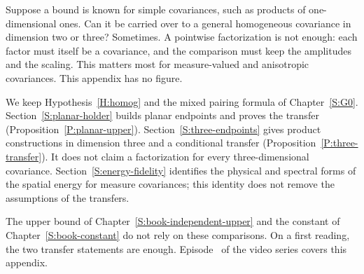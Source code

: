 Suppose a bound is known for simple covariances, such as products of
one-dimensional ones. Can it be carried over to a general homogeneous
covariance in dimension two or three? Sometimes. A pointwise factorization is
not enough: each factor must itself be a covariance, and the comparison must
keep the amplitudes and the scaling. This matters most for measure-valued
and anisotropic covariances. This appendix has no figure.

We keep Hypothesis~\ref{H:homog} and the mixed pairing formula
of Chapter~\ref{S:G0}. Section~\ref{S:planar-holder}
builds planar endpoints and proves the transfer
(Proposition~\ref{P:planar-upper}). Section~\ref{S:three-endpoints}
gives product constructions in dimension three and a conditional transfer
(Proposition~\ref{P:three-transfer}). It does not claim a factorization
for every three-dimensional covariance. Section~\ref{S:energy-fidelity}
identifies the physical and spectral forms of the spatial energy for measure
covariances; this identity does not remove the assumptions of the transfers.

The upper bound of Chapter~\ref{S:book-independent-upper} and the
constant of Chapter~\ref{S:book-constant} do not rely on these
comparisons. On a first reading, the two transfer statements are
enough. Episode~ of the video series covers this
appendix.
